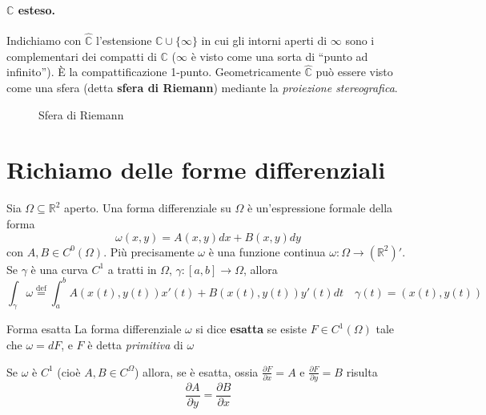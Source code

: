 \paragraph{\(\mathbb{C}\) esteso.} Indichiamo con \(\hat{\mathbb{C}}\)
l'estensione \(\mathbb{C} \cup \{\infty\} \) in cui gli intorni aperti di
\(\infty\) sono i complementari dei compatti di \(\mathbb{C}\) (\(\infty\) è
visto come una sorta di ``punto ad infinito''). È la compattificazione 1-punto.
Geometricamente \(\hat{\mathbb{C}}\) può essere visto come una sfera (detta
\textbf{sfera di Riemann}) mediante la \emph{proiezione stereografica}.
\begin{figure}[ht]
    \centering
    \caption{Sfera di Riemann}
    \label{fig:sfera-di-riemann}
\end{figure}


\newpage
\section{Richiamo delle forme differenziali}

Sia \(\Omega \subseteq \mathbb{R}^{2} \) aperto. Una forma differenziale su \(\Omega\) è
un'espressione formale della forma 
\[
    \omega(x, y) = A(x,y)dx + B(x,y) dy
\]
con \(A, B \in C^{0}(\Omega)\). Più precisamente \(\omega\) è una funzione
continua \(\omega: \Omega \to (\mathbb{R}^{2})'\). Se \(\gamma\) è una curva
\(C^{1}\) a tratti in \(\Omega\), \(\gamma : [a,b] \to \Omega\), allora
\[
    \int_{\gamma}\omega \overset{\text{def}}{=} \int_{a}^{b} A{(x(t), y(t))}
    x'{(t)} + B{(x(t), y(t))} y'{(t)} dt \quad \gamma{(t)} = (x(t), y(t))
\]
\begin{definition}{Forma esatta}
    La forma differenziale \(\omega\) si dice \textbf{esatta} se esiste \(F \in
    C^{1}(\Omega)\) tale che \(\omega = dF\), e \(F\) è detta \emph{primitiva}
    di \(\omega\) 
\end{definition}

Se \(\omega\) è \(C^{1}\) (cioè \(A, B \in C^{\Omega}\)) allora, se è esatta,
ossia \(\frac{\partial F}{\partial x} = A\) e \(\frac{\partial F}{\partial y} =
B\) risulta
\begin{equation}\label{eq:forma-chiusa}
    \frac{\partial A}{\partial y} = \frac{\partial B}{\partial x}
\end{equation}

